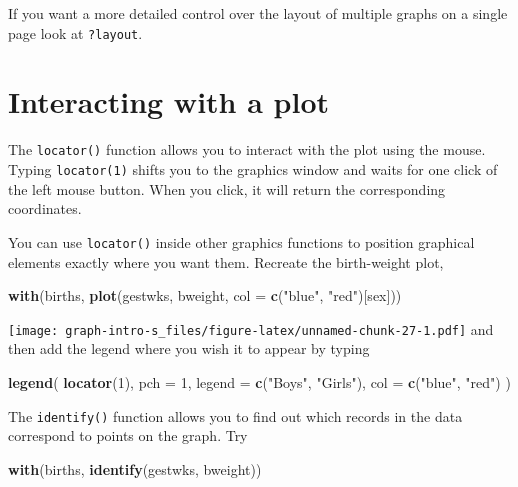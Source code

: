 \documentclass[
]{book}
\newenvironment{Shaded}{\begin{snugshade}}{\end{snugshade}}
\newcommand{\AttributeTok}[1]{\textcolor[rgb]{0.13,0.29,0.53}{#1}}
\newcommand{\DecValTok}[1]{\textcolor[rgb]{0.00,0.00,0.81}{#1}}
\newcommand{\FunctionTok}[1]{\textcolor[rgb]{0.13,0.29,0.53}{\textbf{#1}}}
\newcommand{\NormalTok}[1]{#1}
\newcommand{\StringTok}[1]{\textcolor[rgb]{0.31,0.60,0.02}{#1}}
\begin{document}
If you want a more detailed control over the layout of multiple graphs
on a single page look at \texttt{?layout}.

\section{Interacting with a plot}\label{interacting-with-a-plot}

The \texttt{locator()} function allows you to interact with the plot
using the mouse. Typing \texttt{locator(1)} shifts you to the graphics
window and waits for one click of the left mouse button. When you click,
it will return the corresponding coordinates.

You can use \texttt{locator()} inside other graphics functions to position
graphical elements exactly where you want them. Recreate the birth-weight
plot,

\begin{Shaded}
\begin{Highlighting}[]
\FunctionTok{with}\NormalTok{(births, }\FunctionTok{plot}\NormalTok{(gestwks, bweight, }\AttributeTok{col =} \FunctionTok{c}\NormalTok{(}\StringTok{"blue"}\NormalTok{, }\StringTok{"red"}\NormalTok{)[sex]))}
\end{Highlighting}
\end{Shaded}

\texttt{[image: graph-intro-s\_files/figure-latex/unnamed-chunk-27-1.pdf]}
and then add the legend where you wish it to appear by typing

\begin{Shaded}
\begin{Highlighting}[]
\FunctionTok{legend}\NormalTok{(}
  \FunctionTok{locator}\NormalTok{(}\DecValTok{1}\NormalTok{), }
  \AttributeTok{pch =} \DecValTok{1}\NormalTok{, }
  \AttributeTok{legend =} \FunctionTok{c}\NormalTok{(}\StringTok{"Boys"}\NormalTok{, }\StringTok{"Girls"}\NormalTok{), }
  \AttributeTok{col =} \FunctionTok{c}\NormalTok{(}\StringTok{"blue"}\NormalTok{, }\StringTok{"red"}\NormalTok{)}
\NormalTok{)}
\end{Highlighting}
\end{Shaded}

The \texttt{identify()} function allows you to find out which records
in the data correspond to points on the graph. Try

\begin{Shaded}
\begin{Highlighting}[]
\FunctionTok{with}\NormalTok{(births, }\FunctionTok{identify}\NormalTok{(gestwks, bweight))}
\end{Highlighting}
\end{Shaded}
\end{document}
